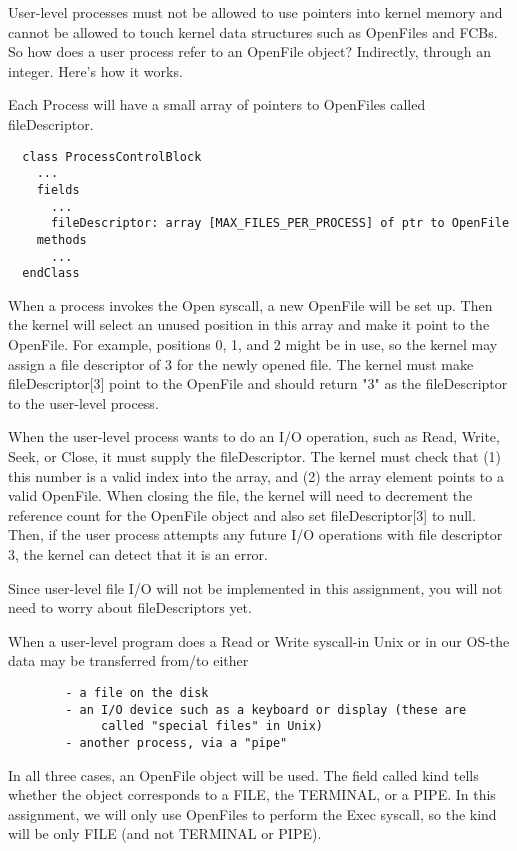 \documentclass[12pt]{article}
\begin{document}
User-level processes must not be allowed to use pointers into kernel
memory and cannot be allowed to touch kernel data structures such as
OpenFiles and FCBs.  So how does a user process refer to an OpenFile
object?  Indirectly, through an integer.  Here's how it works.

Each Process will have a small array of pointers to OpenFiles called
fileDescriptor.

\begin{verbatim}
  class ProcessControlBlock
    ...
    fields
      ...
      fileDescriptor: array [MAX_FILES_PER_PROCESS] of ptr to OpenFile
    methods
      ...
  endClass
\end{verbatim}

When a process invokes the Open syscall, a new OpenFile will be set
up.  Then the kernel will select an unused position in this array and
make it point to the OpenFile.  For example, positions 0, 1, and 2
might be in use, so the kernel may assign a file descriptor of 3 for
the newly opened file.  The kernel must make fileDescriptor[3] point
to the OpenFile and should return "3" as the fileDescriptor to the
user-level process.

When the user-level process wants to do an I/O operation, such as
Read, Write, Seek, or Close, it must supply the fileDescriptor.  The
kernel must check that (1) this number is a valid index into the
array, and (2) the array element points to a valid OpenFile.  When
closing the file, the kernel will need to decrement the reference
count for the OpenFile object and also set fileDescriptor[3] to null.
Then, if the user process attempts any future I/O operations with file
descriptor 3, the kernel can detect that it is an error.

Since user-level file I/O will not be implemented in this assignment,
you will not need to worry about fileDescriptors yet.

When a user-level program does a Read or Write syscall-in Unix or in
our OS-the data may be transferred from/to either
\begin{verbatim}
        - a file on the disk
        - an I/O device such as a keyboard or display (these are 
             called "special files" in Unix)
        - another process, via a "pipe"
\end{verbatim}

In all three cases, an OpenFile object will be used.  The field called
kind tells whether the object corresponds to a FILE, the TERMINAL, or
a PIPE.  In this assignment, we will only use OpenFiles to perform the
Exec syscall, so the kind will be only FILE (and not TERMINAL or
PIPE).
\end{document}
